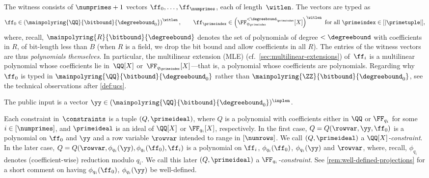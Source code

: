The witness consists of $\numprimes+1$ vectors $\ff_0, \ldots, \ff_{\numprimes}$, each of length~$\witlen$. The vectors are typed  as
%
$$
\ff_0 \in \left(\mainpolyring{\QQ}{\bitbound}{\degreebound_0}\right)^{\witlen}, \qquad \ff_\primeindex \in \left(\FF_{q_\primeindex}^{<\degreebound_\primeindex}[X]\right)^{\witlen} \text{ for all } \primeindex\in[|\primetuple|],
$$
%
where, recall, $\mainpolyring{R}{\bitbound}{\degreebound}$ denotes the set of polynomials of degree $< \degreebound$ with coefficients in $R$, of bit-length less than $B$ (when $R$ is a field, we drop the bit bound and allow coefficients in all $R$). 
The entries of the witness vectors are thus \emph{polynomials themselves}. In particular, the multilinear extension (MLE) (cf.\ \cref{sec:multilinear-extensions}) of~$\ff_i$ is a multilinear polynomial whose coefficients lie in~$\QQ[X]$ or~$\FF_{q_\primeindex}[X]$---that is, a polynomial whose coefficients are polynomials. Regarding why $\ff_0$ is typed in $\mainpolyring{\QQ}{\bitbound}{\degreebound_0}$ rather than $\mainpolyring{\ZZ}{\bitbound}{\degreebound_0}$, see the technical observations after \cref{def:ucs}.

The public input is a vector $\yy\in(\mainpolyring{\QQ}{\bitbound}{\degreebound_0})^{\inplen}$.

Each constraint in~$\constraints$ is a tuple $(Q,\primeideal)$, where $Q$ is a polynomial with coefficients either in $\QQ$ or $\FF_{q_i}$ for some $i\in [\numprimes]$, and $\primeideal$ is an ideal of $\QQ[X]$ or $\FF_{q_i}[X]$, respectively. In the first case, $Q=Q(\rowvar,\yy,\ff_0)$ is a polynomial on $\ff_0$ and  $\yy$ and a row variable $\rowvar$ intended to range in $[\numrows]$. We call $(Q,\primeideal)$ a \emph{$\QQ[X]$-constraint}. In the later case, $Q=Q(\rowvar, \phi_{q_i}(\yy), \phi_{q_i}(\ff_0), \ff_i)$ is a polynomial on $\ff_i$, $\phi_{q_i}(\ff_0)$, $\phi_{q_i}(\yy)$ and $\rowvar$, where, recall, $\phi_{q_i}$ denotes (coefficient-wise) reduction modulo $q_i$.  We call this later $(Q,\primeideal)$ a \emph{$\FF_{q_i}$-constraint}. See \cref{rem:well-defined-projections} for a short comment on having $\phi_{q_i}(\ff_0)$, $\phi_{q_i}(\yy)$ be well-defined.

